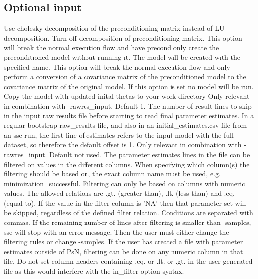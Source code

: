 \subsection{Optional input}

\begin{optionlist}
Use cholesky decomposition of the preconditioning matrix instead of LU decomposition.
\nextopt
{}
Turn off decomposition of preconditioning matrix.
\nextopt
{}
This option will break the normal execution flow and have precond only create the preconditioned model without running it.
The model will be created with the specified name.
\nextopt
{}
This option will break the normal execution flow and only perform a conversion of a covariance matrix of the preconditioned model to the covariance matrix of the original model.
If this option is set no model will be run.
\nextopt
{}
Copy the model with updated inital thetas to your work directory	
\nextopt
{}
Only relevant in combination with -rawres\_input. Default 1. The number of result lines to skip in the input raw results file before starting to read final parameter estimates. In a regular bootstrap raw\_results file, and also in an initial\_estimates.csv file from an sse run, the first line of estimates refers to the input model with the full dataset, so therefore the default offset is 1.
\nextopt
{}
Only relevant in combination with -rawres\_input. Default not used. The parameter estimates lines in the file can be filtered on values in the different columns. When specifying which column(s) the filtering should be based on, the exact column name must be used, e.g. minimization\_successful. Filtering can only be based on columns with numeric values. The allowed relations are .gt. (greater than), .lt. (less than) and .eq. (equal to). If the value in the filter column is 'NA' then that parameter set will be skipped, regardless of the defined filter relation. Conditions are separated with commas. If the remaining number of lines after filtering is smaller than -samples, sse will stop with an error message. Then the user must either change the filtering rules or change -samples. If the user has created a file with parameter estimates outside of PsN, filtering can be done on any numeric column in that file. Do not set column headers containing .eq. or .lt. or .gt. in the user-generated file as this would interfere with the in\_filter option syntax.
\nextopt
\end{optionlist}


